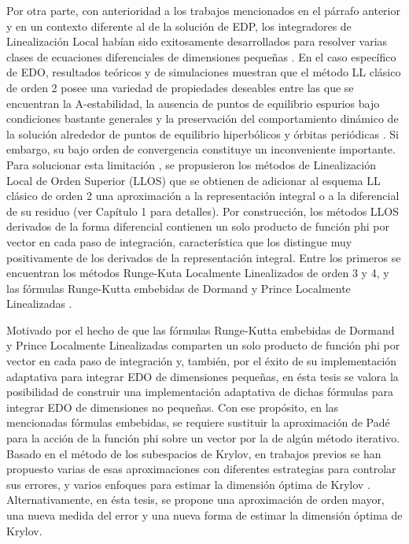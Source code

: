 Por otra parte, con anterioridad a los trabajos mencionados en el párrafo anterior y en un contexto diferente al de la solución de EDP, los integradores de Linealización Local habían sido exitosamente desarrollados para resolver varias clases de ecuaciones diferenciales de dimensiones pequeñas \cite{jimenez2020}.
 En el caso específico de EDO, resultados teóricos y de simulaciones muestran que el método LL clásico de orden 2  \cite{pope1963exponential} posee una variedad de propiedades deseables entre las que se encuentran la A-estabilidad, la ausencia de puntos de equilibrio espurios bajo condiciones bastante generales y la preservación del comportamiento dinámico de la solución alrededor de puntos de equilibrio hiperbólicos y órbitas periódicas \cite{Jimenez02AMC}. Si embargo, su bajo orden de convergencia constituye un inconveniente importante. Para solucionar esta limitación \cite{delaCruz06,delaCruz07,Jimenez13}, se propusieron los métodos de Linealización Local de Orden Superior (LLOS) que se obtienen de adicionar al esquema LL clásico de orden 2 una aproximación a la representación integral o a la diferencial de su residuo (ver Capítulo 1 para detalles). Por construcción, los métodos LLOS derivados de la forma diferencial contienen un solo  producto de función phi por vector en cada paso de integración, característica que los distingue muy positivamente de los derivados de la representación integral. Entre los primeros se encuentran los métodos Runge-Kuta Localmente Linealizados de orden 3 y 4, y las fórmulas Runge-Kutta embebidas de Dormand y Prince Localmente Linealizadas \cite{delaCruz06,Jimenez13,Jimenez14AMC}.

Motivado por el hecho de que las fórmulas Runge-Kutta embebidas de Dormand y Prince Localmente Linealizadas comparten un solo producto de función phi por vector en cada paso de integración y, también, por el éxito de su implementación adaptativa para integrar EDO de dimensiones pequeñas, en ésta tesis se valora la posibilidad de construir una implementación adaptativa de dichas fórmulas para integrar EDO de dimensiones no pequeñas. Con ese propósito, en las mencionadas fórmulas embebidas, se requiere sustituir la aproximación de Padé para la acción de la función phi sobre un vector por la de algún método iterativo. Basado en el método de los subespacios de Krylov, en trabajos previos se han propuesto varias de esas aproximaciones con diferentes estrategias para controlar sus errores, y varios enfoques para estimar la dimensión óptima de Krylov \cite{hochbruck1998exponential,sidje1998expokit,niesen2012algorithm,gaudreault2018kiops}. Alternativamente, en ésta tesis, se propone una aproximación de orden mayor, una nueva medida del error y una nueva forma de estimar la dimensión óptima de Krylov.

